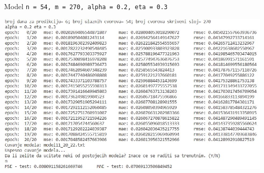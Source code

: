 \documentclass{beamer}
\begin{document}

\begin{frame}{\small{Model \texttt{n = 54, m = 270, alpha = 0.2, eta = 0.3}}}
    \begin{center}
    \includegraphics[scale=0.55]{output/output_example_program_11_20_22.JPG}
    \end{center}
\end{frame}
\end{document}
